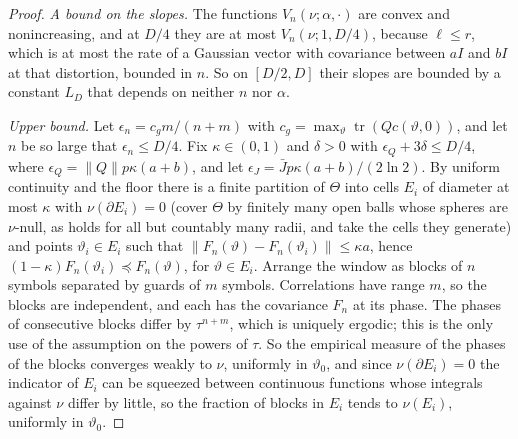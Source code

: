 \documentclass[11pt,onecolumn]{IEEEtran}
\newcommand{\tr}{\operatorname{tr}}
\begin{document}
\begin{proof}
\emph{A bound on the slopes.} The functions $V_n(\nu;\alpha,\cdot)$ are
convex and nonincreasing, and at $D/4$ they are at most $V_n(\nu;1,D/4)$,
because $\ell\le r$, which is at most the rate of a Gaussian vector with
covariance between $aI$ and $bI$ at that distortion, bounded in $n$. So
on $[D/2,D]$ their slopes are bounded by a constant $L_D$ that depends
on neither $n$ nor $\alpha$.

\emph{Upper bound.} Let $\epsilon_n=c_gm/(n+m)$ with
$c_g=\max_\vartheta\tr(Qc(\vartheta,0))$, and let $n$ be so large that
$\epsilon_n\le D/4$. Fix $\kappa\in(0,1)$ and $\delta>0$ with
$\epsilon_Q+3\delta\le D/4$, where $\epsilon_Q=\|Q\|p\kappa(a+b)$, and let
$\epsilon_J=\bar Jp\kappa(a+b)/(2\ln2)$. By uniform continuity and the floor
there is a finite partition of $\Theta$ into cells $E_i$ of diameter at
most $\kappa$ with $\nu(\partial E_i)=0$ (cover $\Theta$ by finitely many
open balls whose spheres are $\nu$-null, as holds for all but countably
many radii, and take the cells they generate) and points
$\vartheta_i\in E_i$ such that $\|F_n(\vartheta)-F_n(\vartheta_i)\|\le\kappa a$, hence
$(1-\kappa)F_n(\vartheta_i)\preceq F_n(\vartheta)$, for $\vartheta\in E_i$. Arrange the
window as blocks of $n$ symbols separated by guards of $m$ symbols.
Correlations have range $m$, so the blocks are independent, and each
has the covariance $F_n$ at its phase. The phases of consecutive blocks
differ by $\tau^{n+m}$, which is uniquely ergodic; this is the only use of
the assumption on the powers of $\tau$. So the empirical measure of the
phases of the blocks converges weakly to $\nu$, uniformly in
$\vartheta_0$, and since $\nu(\partial E_i)=0$ the indicator of $E_i$ can be
squeezed between continuous functions whose integrals against $\nu$
differ by little, so the fraction of blocks in $E_i$ tends to $\nu(E_i)$,
uniformly in $\vartheta_0$.


\end{proof}
\end{document}
